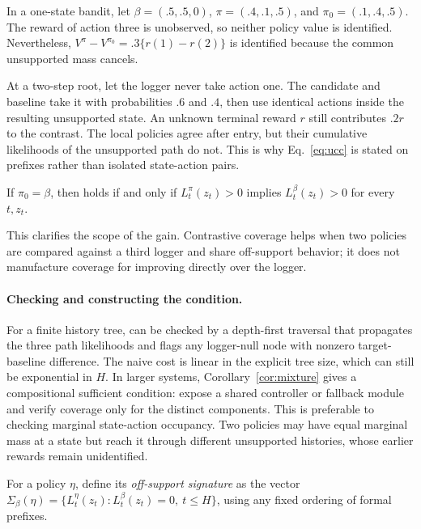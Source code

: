 \begin{example}
In a one-state bandit, let
$\beta=(.5,.5,0)$,
$\pi=(.4,.1,.5)$, and
$\pi_0=(.1,.4,.5)$.
The reward of action three is unobserved, so neither policy value is identified. Nevertheless,
$V^\pi-V^{\pi_0}=.3\{r(1)-r(2)\}$ is identified because the common unsupported mass cancels.
\end{example}

\begin{example}
At a two-step root, let the logger never take action one. The candidate and baseline take it with probabilities $.6$ and $.4$, then use identical actions inside the resulting unsupported state. An unknown terminal reward $r$ still contributes $.2r$ to the contrast. The local policies agree after entry, but their cumulative likelihoods of the unsupported path do not. This is why Eq.~\eqref{eq:ucc} is stated on prefixes rather than isolated state-action pairs.
\end{example}

\begin{proposition}
If $\pi_0=\beta$, then \UCC holds if and only if $L_t^\pi(z_t)>0$ implies $L_t^\beta(z_t)>0$ for every $t,z_t$.
\label{prop:logger}
\end{proposition}
This clarifies the scope of the gain. Contrastive coverage helps when two policies are compared against a third logger and share off-support behavior; it does not manufacture coverage for improving directly over the logger.

\paragraph{Checking and constructing the condition.}
For a finite history tree, \UCC can be checked by a depth-first traversal that propagates the three path likelihoods and flags any logger-null node with nonzero target-baseline difference. The naive cost is linear in the explicit tree size, which can still be exponential in $H$. In larger systems, Corollary~\ref{cor:mixture} gives a compositional sufficient condition: expose a shared controller or fallback module and verify coverage only for the distinct components. This is preferable to checking marginal state-action occupancy. Two policies may have equal marginal mass at a state but reach it through different unsupported histories, whose earlier rewards remain unidentified.

For a policy $\eta$, define its \emph{off-support signature} as the vector
$\Sigma_\beta(\eta)=\{L_t^\eta(z_t):L_t^\beta(z_t)=0,\ t\le H\}$,
using any fixed ordering of formal prefixes.

